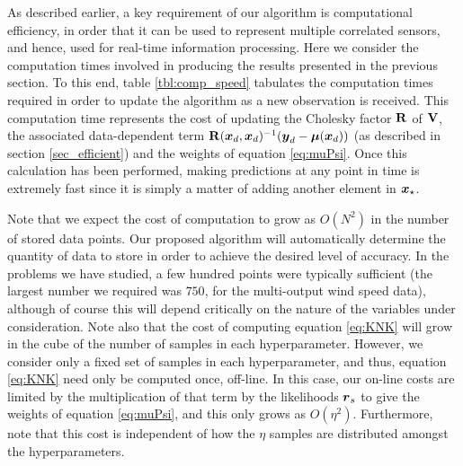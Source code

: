 \documentclass{acmtrans2m}
\begin{document}
\noindent As described earlier, a key requirement of our algorithm is computational efficiency, in order that it can be used to represent multiple correlated sensors, and hence, used for real-time information processing. Here we consider the computation times involved in producing the results presented in the previous section. To this end, table \ref{tbl:comp_speed}  tabulates the computation times required in order to update the algorithm as a new observation is received. This computation time represents the cost of updating the Cholesky factor $\mathbf{R}$ of $\mathbf{V}$, the associated data-dependent term $\mathbf{R}(\boldsymbol{x}_d,\boldsymbol{x}_d)^{-1}(\boldsymbol{y}_d-\boldsymbol{\mu}(\boldsymbol{x}_d))$ (as described in section \ref{sec_efficient}) and the weights of equation \eqref{eq:muPsi}. Once this calculation has been performed, making predictions at any point in time is extremely fast since it is simply a matter of adding another element in $\boldsymbol{x}_\star$.

Note that we expect the cost of computation to grow as $O(N^2)$ in the number of stored data points. Our proposed algorithm will automatically determine the quantity of data to store in order to achieve the desired level of accuracy. In the problems we have studied, a few hundred points were typically sufficient (the largest number we required was $750$, for the multi-output wind speed data), although of course this will depend critically on the nature of the variables under consideration. Note also that the cost of computing equation \eqref{eq:KNK} will grow in the cube of the number of samples in each hyperparameter. However, we consider only a fixed set of samples in each hyperparameter, and thus, equation \eqref{eq:KNK} need only be computed once, off-line. In this case, our on-line costs are limited by the multiplication of that term by the likelihoods $\boldsymbol{r}_s$ to give the weights of equation \eqref{eq:muPsi}, and this only grows as $O(\eta^2)$. Furthermore, note that this cost is independent of how the $\eta$ samples are distributed amongst the hyperparameters.
\end{document}
